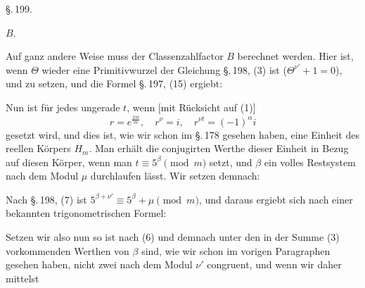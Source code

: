 
\begin{center}
\S.\,199.

 $B$.
\end{center}

Auf ganz andere Weise muss der Classenzahlfactor $B$ berechnet werden. Hier ist, wenn $\Theta$ wieder eine Primitivwurzel
der Gleichung \S.\,198, (3) ist ($\Theta^{\nu'} + 1 = 0$), und
zu setzen, und die Formel \S.\,197, (15) ergiebt:

Nun ist für jedes ungerade $t$, wenn [mit Rücksicht auf (1)]
\[
r = e^{\frac{2\pi i}{m}}, \quad r^\nu = i, \quad r^{\nu t} = (-1)^\alpha i
\]
gesetzt wird,
und dies ist, wie wir schon im \S.\,178 gesehen haben, eine Einheit des reellen Körpers $H_m$. Man erhält die conjugirten Werthe
dieser Einheit in Bezug auf diesen Körper, wenn man $t \equiv 5^\beta \pmod{m}$ setzt, und $\beta$ ein volles Restsystem nach dem Modul $\mu$
durchlaufen lässt. Wir setzen demnach:

Nach \S.\,198, (7) ist $5^{\beta+\nu'} \equiv 5^\beta + \mu \pmod{m}$, und daraus
ergiebt sich nach einer bekannten trigonometrischen Formel:

Setzen wir also nun
so ist nach (6)
und demnach
unter den in der Summe (3) vorkommenden Werthen von $\beta$
sind, wie wir schon im vorigen Paragraphen gesehen haben, nicht
zwei nach dem Modul $\nu'$ congruent, und wenn wir daher mittelst

